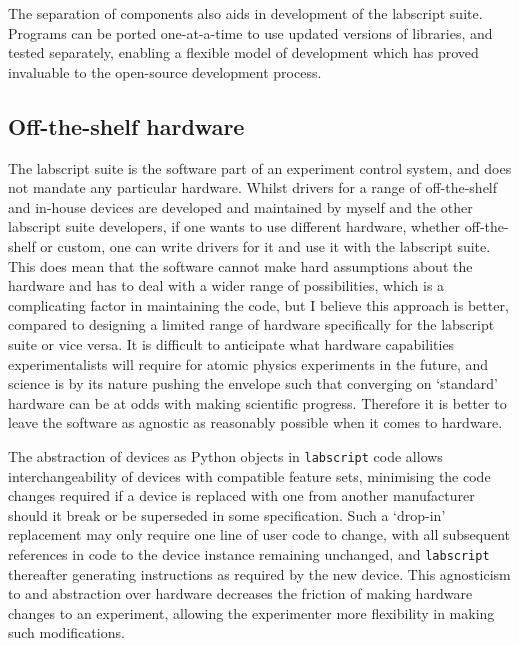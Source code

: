 The separation of components also aids in development of the labscript suite. Programs can be ported one-at-a-time to use updated versions of libraries, and tested separately, enabling a flexible model of development which has proved invaluable to the open-source development process. 


\subsection{Off-the-shelf hardware}

The labscript suite is the software part of an experiment control system, and does not mandate any particular hardware. Whilst drivers for a range of off-the-shelf and in-house devices are developed and maintained by myself and the other labscript suite developers, if one wants to use different hardware, whether off-the-shelf or custom, one can write drivers for it and use it with the labscript suite. This does mean that the software cannot make hard assumptions about the hardware and has to deal with a wider range of possibilities, which is a complicating factor in maintaining the code, but I believe this approach is better, compared to designing a limited range of hardware specifically for the labscript suite or vice versa. It is difficult to anticipate what hardware capabilities experimentalists will require for atomic physics experiments in the future, and science is by its nature pushing the envelope such that converging on `standard' hardware can be at odds with making scientific progress. Therefore it is better to leave the software as agnostic as reasonably possible when it comes to hardware.

The abstraction of devices as Python objects in \texttt{labscript} code allows interchangeability of devices with compatible feature sets, minimising the code changes required if a device is replaced with one from another manufacturer should it break or be superseded in some specification. Such a `drop-in' replacement may only require one line of user code to change, with all subsequent references in code to the device instance remaining unchanged, and \texttt{labscript} thereafter generating instructions as required by the new device. This agnosticism to and abstraction over hardware decreases the friction of making hardware changes to an experiment, allowing the experimenter more flexibility in making such modifications.

